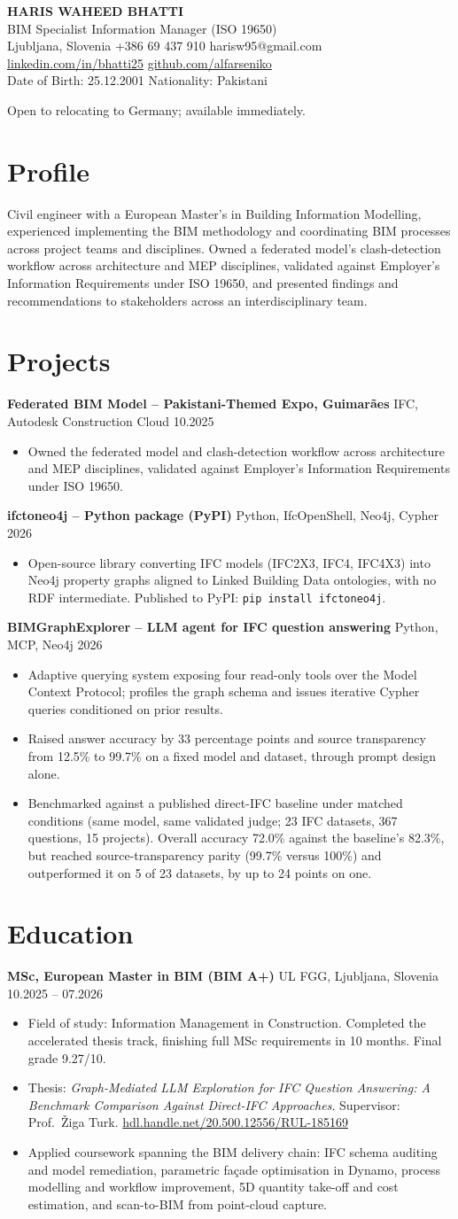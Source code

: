 \documentclass[a4paper,10.5pt]{article}
\newcommand{\datefill}{\dotfill}
\newcommand{\entry}[3]{\vspace{2.5pt}\noindent\textbf{#1} \textbar{} #2 \datefill{} #3\par\vspace{0.5pt}}
\newcommand{\ROLELINE}{BIM Specialist \textbar{} Information Manager (ISO 19650)}
\newcommand{\projIfcToNeo}{%
\entry{ifctoneo4j -- Python package (PyPI)}{Python, IfcOpenShell, Neo4j, Cypher}{2026}
\begin{itemize}
  \item Open-source library converting IFC models (IFC2X3, IFC4, IFC4X3) into Neo4j
        property graphs aligned to Linked Building Data ontologies, with no RDF
        intermediate. Published to PyPI: \texttt{pip install ifctoneo4j}.
\end{itemize}}
\newcommand{\projBIMGraph}{%
\entry{BIMGraphExplorer -- LLM agent for IFC question answering}{Python, MCP, Neo4j}{2026}
\begin{itemize}
  \item Adaptive querying system exposing four read-only tools over the Model
        Context Protocol; profiles the graph schema and issues iterative Cypher
        queries conditioned on prior results.
  \item Raised answer accuracy by 33 percentage points and source transparency from
        12.5\% to 99.7\% on a fixed model and dataset, through prompt design alone.
  \item Benchmarked against a published direct-IFC baseline under matched
        conditions (same model, same validated judge; 23 IFC datasets, 367
        questions, 15 projects). Overall accuracy 72.0\% against the baseline's
        82.3\%, but reached source-transparency parity (99.7\% versus 100\%) and
        outperformed it on 5 of 23 datasets, by up to 24 points on one.
\end{itemize}}
\newcommand{\projGuimaraes}{%
\entry{Federated BIM Model -- Pakistani-Themed Expo, Guimar\~aes}{IFC, Autodesk Construction Cloud}{10.2025}
\begin{itemize}
  \item Owned the federated model and clash-detection workflow across architecture
        and MEP disciplines, validated against Employer's Information Requirements
        under ISO 19650.
\end{itemize}}
\begin{document}
\begin{center}
  {\LARGE\bfseries HARIS WAHEED BHATTI}\\[2pt]
  {\large \ROLELINE}\\[3pt]
  Ljubljana, Slovenia \textbar{} +386 69 437 910 \textbar{} harisw95@gmail.com\\
  \href{https://linkedin.com/in/bhatti25}{linkedin.com/in/bhatti25} \textbar{}
  \href{https://github.com/alfarseniko}{github.com/alfarseniko}\\
  Date of Birth: 25.12.2001 \textbar{} Nationality: Pakistani
\end{center}
\vspace{-4pt}
\noindent\small Open to relocating to Germany; available immediately.\normalsize

\section{Profile}

\noindent Civil engineer with a European Master's in Building Information Modelling,
experienced implementing the BIM methodology and coordinating BIM processes across
project teams and disciplines. Owned a federated model's clash-detection workflow
across architecture and MEP disciplines, validated against Employer's Information
Requirements under ISO 19650, and presented findings and recommendations to
stakeholders across an interdisciplinary team.

\section{Projects}

 \projGuimaraes \projIfcToNeo \projBIMGraph

\section{Education}
\entry{MSc, European Master in BIM (BIM A+)}{UL FGG, Ljubljana, Slovenia}{10.2025 -- 07.2026}
\begin{itemize}
  \item Field of study: Information Management in Construction. Completed the
        accelerated thesis track, finishing full MSc requirements in 10 months.
        Final grade 9.27/10.
  \item Thesis: \textit{Graph-Mediated LLM Exploration for IFC Question Answering:
        A Benchmark Comparison Against Direct-IFC Approaches}. Supervisor:
        Prof.~\v{Z}iga Turk. \href{http://hdl.handle.net/20.500.12556/RUL-185169}{hdl.handle.net/20.500.12556/RUL-185169}
  \item Applied coursework spanning the BIM delivery chain: IFC schema auditing and model remediation, parametric façade optimisation in Dynamo, process modelling and workflow improvement, 5D quantity take-off and cost estimation, and scan-to-BIM from point-cloud capture.
\end{itemize}
\end{document}
